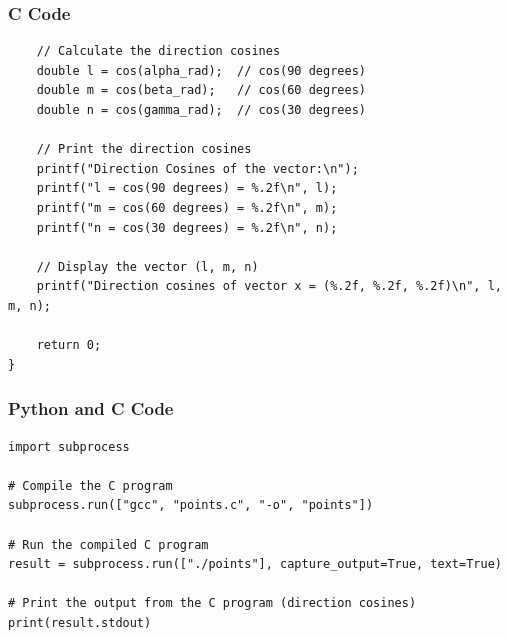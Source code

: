 \documentclass{beamer}
\begin{document}
\begin{frame}[fragile]
\frametitle{C Code}
\begin{lstlisting}
    // Calculate the direction cosines
    double l = cos(alpha_rad);  // cos(90 degrees)
    double m = cos(beta_rad);   // cos(60 degrees)
    double n = cos(gamma_rad);  // cos(30 degrees)

    // Print the direction cosines
    printf("Direction Cosines of the vector:\n");
    printf("l = cos(90 degrees) = %.2f\n", l);
    printf("m = cos(60 degrees) = %.2f\n", m);
    printf("n = cos(30 degrees) = %.2f\n", n);

    // Display the vector (l, m, n)
    printf("Direction cosines of vector x = (%.2f, %.2f, %.2f)\n", l, m, n);

    return 0;
}
\end{lstlisting}
\end{frame}


\begin{frame}[fragile]
\frametitle{Python and C Code}

\begin{lstlisting}
import subprocess

# Compile the C program
subprocess.run(["gcc", "points.c", "-o", "points"])

# Run the compiled C program
result = subprocess.run(["./points"], capture_output=True, text=True)

# Print the output from the C program (direction cosines)
print(result.stdout) 

\end{lstlisting}

\end{frame}

 
\end{document}
